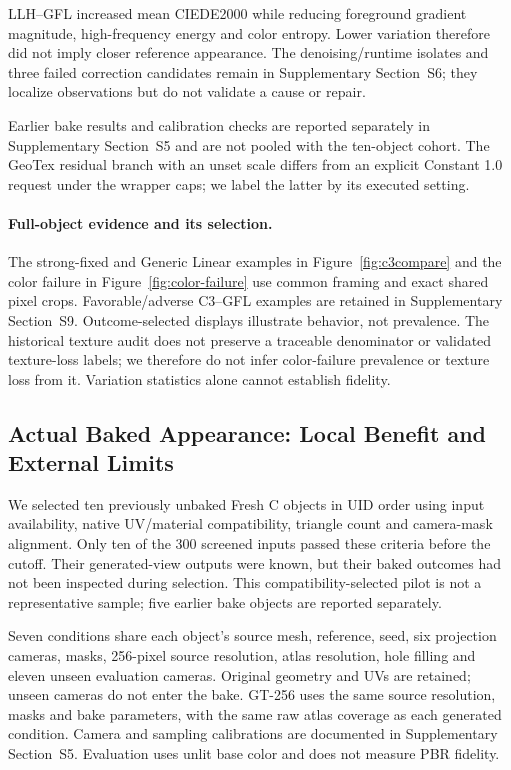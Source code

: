 \documentclass[times,twocolumn,final]{elsarticle}
\begin{document}
LLH--GFL increased mean CIEDE2000 while reducing foreground gradient magnitude, high-frequency energy and color entropy. Lower variation therefore did not imply closer reference appearance. The denoising/runtime isolates and three failed correction candidates remain in Supplementary Section~S6; they localize observations but do not validate a cause or repair.

Earlier bake results and calibration checks are reported separately in Supplementary Section~S5 and are not pooled with the ten-object cohort. The GeoTex residual branch with an unset scale differs from an explicit Constant 1.0 request under the wrapper caps; we label the latter by its executed setting.

\paragraph{Full-object evidence and its selection.}
The strong-fixed and Generic Linear examples in Figure~\ref{fig:c3compare} and the color failure in Figure~\ref{fig:color-failure} use common framing and exact shared pixel crops. Favorable/adverse C3--GFL examples are retained in Supplementary Section~S9. Outcome-selected displays illustrate behavior, not prevalence. The historical texture audit does not preserve a traceable denominator or validated texture-loss labels; we therefore do not infer color-failure prevalence or texture loss from it. Variation statistics alone cannot establish fidelity.


\subsection{Actual Baked Appearance: Local Benefit and External Limits}
\label{subsec:new-bake}
We selected ten previously unbaked Fresh C objects in UID order using input availability, native UV/material compatibility, triangle count and camera-mask alignment. Only ten of the 300 screened inputs passed these criteria before the cutoff. Their generated-view outputs were known, but their baked outcomes had not been inspected during selection. This compatibility-selected pilot is not a representative sample; five earlier bake objects are reported separately.

Seven conditions share each object's source mesh, reference, seed, six projection cameras, masks, 256-pixel source resolution, atlas resolution, hole filling and eleven unseen evaluation cameras. Original geometry and UVs are retained; unseen cameras do not enter the bake. GT-256 uses the same source resolution, masks and bake parameters, with the same raw atlas coverage as each generated condition. Camera and sampling calibrations are documented in Supplementary Section~S5. Evaluation uses unlit base color and does not measure PBR fidelity.
\end{document}

